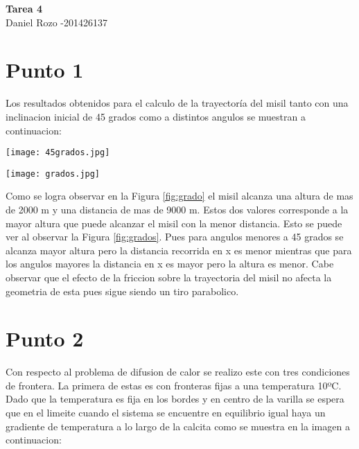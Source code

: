 \documentclass[12pt]{article}
\begin{document}
\begin{center}
 {\Large \textbf{Tarea 4}}\\
 Daniel Rozo -201426137\\
\end{center}
\section{Punto 1}
\noindent Los resultados obtenidos para el calculo de la trayectoría del misil tanto con una inclinacion inicial de 45 grados como a distintos angulos se muestran a continuacion:

\begin{centering}
\captionsetup{type=figure}
\texttt{[image: 45grados.jpg]}
\label{fig:grado}
\end{centering}


\begin{centering}
\captionsetup{type=figure}
\texttt{[image: grados.jpg]}
\label{fig:grados}
\end{centering}

\noindent Como se logra observar en la Figura \ref{fig:grado} el misil alcanza una altura de mas de 2000 m y una distancia de mas de 9000 m. Estos dos valores corresponde a la mayor altura que puede alcanzar el misil con la menor distancia. Esto se puede ver al observar la Figura \ref{fig:grados}. Pues para angulos menores a 45 grados se alcanza mayor altura pero la distancia recorrida en x es menor mientras que para los angulos mayores la distancia en x es mayor pero la altura es menor. Cabe observar que el efecto de la friccion sobre la trayectoria del misil no afecta la geometria de esta pues sigue siendo un tiro parabolico. 

\section{Punto 2}

\noindent Con respecto al problema de difusion de calor se realizo este con tres condiciones de frontera. La primera de estas es con fronteras fijas a una temperatura 10ºC. Dado que la temperatura es fija en los bordes y en centro de la varilla se espera que en el limeite cuando el sistema se encuentre en equilibrio igual haya un gradiente de temperatura a lo largo de la calcita como se muestra en la imagen a continuacion:
\end{document}
